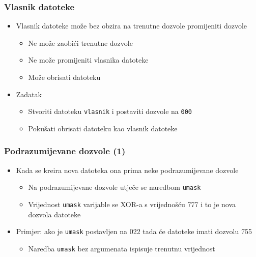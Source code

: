 \documentclass[table,usenames,dvipsnames]{beamer}
\newcommand{\shell}[1]{\texttt{#1}}
\begin{document}
\begin{frame}[t]
\frametitle{Vlasnik datoteke}
\begin{itemize}
  \item Vlasnik datoteke može bez obzira na trenutne dozvole promijeniti 
        dozvole
  \begin{itemize}
    \item Ne može zaobići trenutne dozvole
    \item Ne može promijeniti vlasnika datoteke
    \item Može obrisati datoteku
  \end{itemize}
  \item Zadatak
  \begin{itemize}
    \item Stvoriti datoteku \shell{vlasnik} i postaviti dozvole na 
          \shell{000}
    \item Pokušati obrisati datoteku kao vlasnik datoteke
  \end{itemize}
\end{itemize}
\end{frame}

\begin{frame}[t]
\frametitle{Podrazumijevane dozvole (1)}
\begin{itemize}
  \item Kada se kreira nova datoteka ona prima neke podrazumijevane dozvole
  \begin{itemize}
    \item Na podrazumijevane dozvole utječe se naredbom \shell{umask}
    \item Vrijednost \shell{umask} varijable se XOR-a s vrijednošću 777 i 
          to je nova dozvola datoteke
  \end{itemize}
  \item Primjer: ako je \shell{umask} postavljen na 022 tada će datoteke 
        imati dozvolu 755
  \begin{itemize}
    \item Naredba \shell{umask} bez argumenata ispisuje trenutnu vrijednost
  \end{itemize}
\end{itemize}
\end{frame}
  
\end{document}
